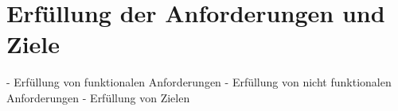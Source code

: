 \section{Erfüllung der Anforderungen und Ziele}
- Erfüllung von funktionalen Anforderungen
- Erfüllung von nicht funktionalen Anforderungen
- Erfüllung von Zielen

